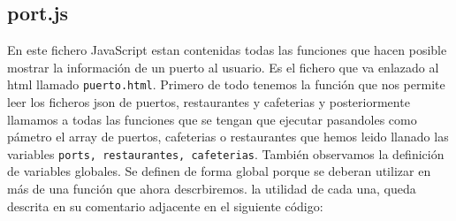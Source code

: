 \documentclass{article}
\begin{document}
\subsection{port.js}
En este fichero JavaScript estan contenidas todas las funciones que hacen posible mostrar la información de un puerto al usuario. Es el fichero que va enlazado al html llamado \texttt{puerto.html}. Primero de todo tenemos la función que nos permite leer los ficheros json de puertos, restaurantes y cafeterias y posteriormente llamamos a todas las funciones que se tengan que ejecutar pasandoles como pámetro el array de puertos, cafeterias o restaurantes  que hemos leido llanado las variables \texttt{ports, restaurantes, cafeterias}. También observamos la definición de variables globales. Se definen de forma global porque se deberan utilizar en más de una función que ahora descrbiremos. la utilidad de cada una, queda descrita en su comentario adjacente en el siguiente código:
\end{document}
